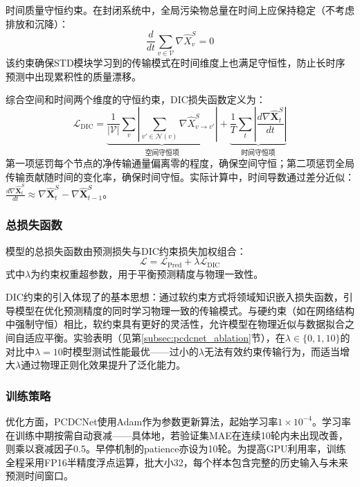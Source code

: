时间质量守恒约束。在封闭系统中，全局污染物总量在时间上应保持稳定（不考虑排放和沉降）：
\begin{equation}
    \frac{d}{dt} \sum_{v \in \mathcal{V}} \nabla \hat{X}_{v}^S = 0
\label{eq:temporal_conservation}
\end{equation}
该约束确保STD模块学习到的传输模式在时间维度上也满足守恒性，防止长时序预测中出现累积性的质量漂移。

综合空间和时间两个维度的守恒约束，DIC损失函数定义为：
\begin{equation}
    \mathcal{L}_{\mathrm{DIC}} = \underbrace{\frac{1}{|\mathcal{V}|} \sum_{v} \left| \sum_{v' \in \mathcal{N}(v)} \nabla \hat{X}_{v \to v'}^S \right|}_{\text{空间守恒项}} + \underbrace{\frac{1}{T} \sum_{t} \left| \frac{d \nabla \hat{\mathbf{X}}_t^S}{dt} \right|}_{\text{时间守恒项}}
\label{eq:dic_loss}
\end{equation}
\noindent 第一项惩罚每个节点的净传输通量偏离零的程度，确保空间守恒；第二项惩罚全局传输贡献随时间的变化率，确保时间守恒。实际计算中，时间导数通过差分近似：$\frac{d \nabla \hat{\mathbf{X}}_t^S}{dt} \approx \nabla \hat{\mathbf{X}}_t^S - \nabla \hat{\mathbf{X}}_{t-1}^S$。

\subsubsection{总损失函数}

模型的总损失函数由预测损失与DIC约束损失加权组合：
\begin{equation}
    \mathcal{L} = \mathcal{L}_{\mathrm{Pred}} + \lambda \mathcal{L}_{\mathrm{DIC}}
\label{eq:total_loss}
\end{equation}
\noindent 式中$\lambda$为约束权重超参数，用于平衡预测精度与物理一致性。

DIC约束的引入体现了的基本思想：通过软约束方式将领域知识嵌入损失函数，引导模型在优化预测精度的同时学习物理一致的传输模式。与硬约束（如在网络结构中强制守恒）相比，软约束具有更好的灵活性，允许模型在物理近似与数据拟合之间自适应平衡。实验表明（见第\ref{subsec:pcdcnet_ablation}节），在$\lambda \in \{0, 1, 10\}$的对比中$\lambda=10$时模型测试性能最优——过小的$\lambda$无法有效约束传输行为，而适当增大$\lambda$通过物理正则化效果提升了泛化能力。

\subsubsection{训练策略}

优化方面，PCDCNet使用Adam\citep{kingma2015adam}作为参数更新算法，起始学习率$1 \times 10^{-4}$。学习率在训练中期按需自动衰减——具体地，若验证集MAE在连续10轮内未出现改善，则乘以衰减因子0.5。早停机制的patience亦设为10轮。为提高GPU利用率，训练全程采用FP16半精度浮点运算，批大小32，每个样本包含完整的历史输入与未来预测时间窗口。

